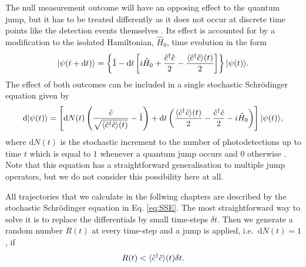 The null measurement outcome will have an opposing effect to the
quantum jump, but it has to be treated differently as it does not
occur at discrete time points like the detection events themselves
\cite{MeasurementControl}. Its effect is accounted for by a
modification to the isolated Hamiltonian, $\hat{H}_0$, time evolution
in the form
\begin{equation}
  | \psi (t + \mathrm{d}t) \rangle = \left\{ \hat{1} - \mathrm{d}t
    \left[ i \hat{H}_0 + \frac{\hat{c}^\dagger \hat{c}}{2} - \frac{\langle \hat{c}^\dagger \hat{c}
        \rangle (t)}{2} \right] \right\} | \psi (t) \rangle.
\end{equation}
The effect of both outcomes can be included in a single stochastic
Schr\"{o}dinger equation given by
\begin{equation}
  \label{eq:SSE}
  \mathrm{d} | \psi(t) \rangle = \left[ \mathrm{d} N(t) \left(
      \frac{\hat{c}} {\sqrt{ \langle \hat{c}^\dagger \hat{c} \rangle (t)}} - \hat{1} \right)
    + \mathrm{d} t \left( \frac{\langle \hat{c}^\dagger \hat{c} \rangle (t)}{2} -
      \frac{ \hat{c}^\dagger \hat{c}}{2} - i \hat{H}_0 \right) \right] | \psi(t) \rangle,
\end{equation}
where $\mathrm{d}N(t)$ is the stochastic increment to the number of
photodetections up to time $t$ which is equal to $1$ whenever a
quantum jump occurs and $0$ otherwise \cite{MeasurementControl}. Note
that this equation has a straightforward generalisation to multiple
jump operators, but we do not consider this possibility here at all.

All trajectories that we calculate in the follwing chapters are
described by the stochastic Schr\"{o}dinger equation in
Eq. \eqref{eq:SSE}. The most straightforward way to solve it is to
replace the differentials by small time-steps $\delta t$. Then we
generate a random number $R(t)$ at every time-step and a jump is
applied, i.e.~$\mathrm{d}N(t) = 1$, if
\begin{equation}
  R(t) < \langle \hat{c}^\dagger \hat{c} \rangle (t) \delta t.
\end{equation}

